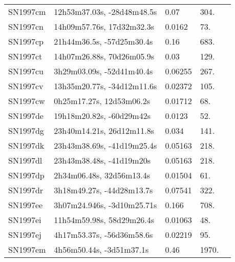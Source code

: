 \begin{longtable}{lllll}
         SN1997cm &     12h53m37.03s, -28d48m48.5s &     0.07 &           304. &    \citet{1998AJ....115...26R} \\
         SN1997cn &      14h09m57.76s, 17d32m32.3s &   0.0162 &            73. &  \citet{1997AandAS..126...15S} \\
         SN1997cp &      21h44m36.5s, -57d25m30.4s &     0.16 &           683. &    \citet{1998AJ....115...26R} \\
         SN1997ct &      14h07m26.88s, 70d26m05.9s &     0.03 &           129. &    \citet{1997IAUC.6691A...1J} \\
         SN1997cu &      3h29m03.09s, -52d41m40.4s &  0.06255 &           267. &  \citet{2009AandA...495..707C} \\
         SN1997cv &     13h35m20.77s, -34d12m11.6s &  0.02372 &           105. &    \citet{2003MNRAS.339..652K} \\
         SN1997cw &       0h25m17.27s, 12d53m06.2s &  0.01712 &            68. &    \citet{1999ApJS..121..287H} \\
         SN1997de &       19h18m20.82s, -60d29m42s &   0.0123 &            52. &    \citet{1988MNRAS.234.1051G} \\
         SN1997dg &      23h40m14.21s, 26d12m11.8s &    0.034 &           141. &    \citet{1997IAUC.6753B...1W} \\
         SN1997dk &     23h43m38.69s, -41d19m25.4s &  0.05163 &           218. &    \citet{20096dF...C...0000J} \\
         SN1997dl &       23h43m38.48s, -41d19m20s &  0.05163 &           218. &    \citet{20096dF...C...0000J} \\
         SN1997dp &       2h34m06.48s, 32d56m13.4s &  0.01504 &            61. &    \citet{2008AJ....135.2424O} \\
         SN1997dr &      3h18m49.27s, -44d28m13.7s &  0.07541 &           322. &    \citet{2005AJ....130.2012W} \\
         SN1997ee &     3h07m24.946s, -3d10m25.71s &    0.166 &           708. &    \citet{1997IAUC.6785B...1D} \\
         SN1997ei &      11h54m59.98s, 58d29m26.4s &  0.01063 &            48. &    \citet{1997AJ....114...77N} \\
         SN1997ej &      4h17m53.37s, -56d36m58.6s &  0.02219 &            95. &    \citet{20096dF...C...0000J} \\
         SN1997em &       4h56m50.44s, -3d51m37.1s &     0.46 &          1970. &    \citet{1998IAUC.6804A...1N} \\

\end{longtable}
